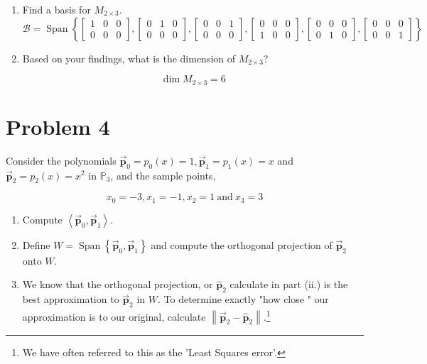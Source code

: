 \documentclass[letter,11pt]{article}
\theoremstyle{definition}
\begin{document}
\begin{tcolorbox}[boxrule=1mm,enhanced jigsaw, breakable,before=\hfill,after=\hfill,adjusted title={Problem 3 solutions}]
    \begin{enumerate}[label = \roman*.]
        \item Find a basis for $M_{2 \times 3}$. 
        $$\mathcal{B} = \operatorname{Span} \left\{\begin{bmatrix} 1 & 0 & 0 \\ 0 & 0 & 0 \end{bmatrix},\begin{bmatrix} 0 & 1 & 0 \\ 0 & 0 & 0 \end{bmatrix}, \begin{bmatrix} 0 & 0 & 1 \\ 0 & 0 & 0 \end{bmatrix}, \begin{bmatrix} 0 & 0 & 0 \\ 1 & 0 & 0 \end{bmatrix}, \begin{bmatrix} 0 & 0 & 0 \\ 0 & 1 & 0 \end{bmatrix}, \begin{bmatrix} 0 & 0 & 0 \\ 0 & 0 & 1 \end{bmatrix}  \right\}$$
        \item Based on your findings, what is the dimension of $M_{2 \times 3}$?

        $$\operatorname{dim} M_{2 \times 3} = 6$$
    \end{enumerate}

\end{tcolorbox}

\section{Problem 4}
Consider the polynomials $\vec{\boldsymbol{p}}_{0}=p_{0}(x)=1, \vec{\boldsymbol{p}}_{1}=p_{1}(x)=x$ and $\vec{\boldsymbol{p}}_{2}=p_{2}(x)=x^{2}$ in $\mathbb{P}_{3}$, and the sample points,

$$x_{0}=-3, x_{1}=-1, x_{2}=1 \: \text {and}\:  x_{3}=3$$

\begin{enumerate}[label = \roman*.]
    \item Compute $\left\langle\vec{\boldsymbol{p}}_{0}, \vec{\boldsymbol{p}}_{1}\right\rangle$.
    \item Define $W=\operatorname{Span}\left\{\vec{\boldsymbol{p}}_{0}, \vec{\boldsymbol{p}}_{1}\right\}$ and compute the orthogonal projection of $\vec{\boldsymbol{p}}_{2}$ onto $W$.
    \item We know that the orthogonal projection, or $\hat{\boldsymbol{p}}_{2}$ calculate in part (ii.) is the best approximation to $\vec{\boldsymbol{p}}_{2}$ in $W$. To determine exactly "how close " our approximation is to our original, calculate $\left\|\vec{\boldsymbol{p}}_{2}-\hat{\boldsymbol{p}}_{2}\right\|$.\footnote{We have often referred to this as the 'Least Squares error'.}
\end{enumerate}
\end{document}
